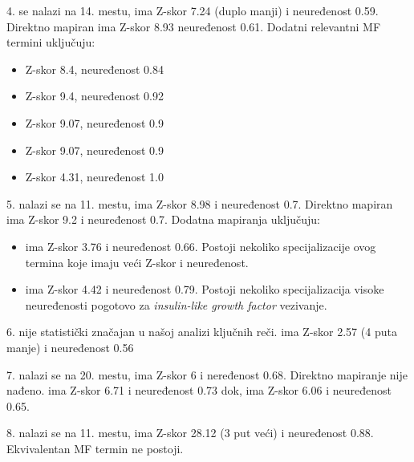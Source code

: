 4.  se nalazi na 14. mestu, ima Z-skor 7.24 (duplo manji) i neuređenost 0.59.
Direktno mapiran  ima Z-skor 8.93 neuređenost 0.61.
Dodatni relevantni MF termini uključuju:
\begin{itemize}
  \item {} Z-skor 8.4, neuređenost 0.84 
  \item {} Z-skor 9.4, neuređenost 0.92 
  \item {} Z-skor 9.07, neuređenost 0.9 
  \item {} Z-skor 9.07, neuređenost 0.9 
  \item {} Z-skor 4.31, neuređenost 1.0 
\end{itemize}


5.  nalazi se na 11. mestu, ima Z-skor 8.98 i neuređenost 0.7.
Direktno mapiran  ima Z-skor 9.2 i neuređenost 0.7.
Dodatna mapiranja uključuju:
\begin{itemize}
  \item {} ima Z-skor 3.76 i neuređenost 0.66.
    Postoji nekoliko specijalizacije ovog termina koje imaju veći Z-skor i neuređenost.
  \item {} ima Z-skor 4.42 i neuređenost 0.79. Postoji
    nekoliko specijalizacija visoke neuređenosti pogotovo za
    \textit{insulin-like growth factor} vezivanje.
\end{itemize}


6.  nije statistički značajan u našoj analizi ključnih reči.
 ima Z-skor 2.57 (4 puta manje) i neuređenost 0.56

7.  nalazi se na 20. mestu, ima Z-skor 6 i neređenost 0.68.
Direktno mapiranje nije nađeno.
 ima Z-skor 6.71 i neuređenost 0.73 dok,
 ima Z-skor 6.06 i neuređenost 0.65.


8.  nalazi se na 11. mestu, ima Z-skor 28.12 (3 put veći) i neuređenost 0.88.
\\ Ekvivalentan MF termin ne postoji.


